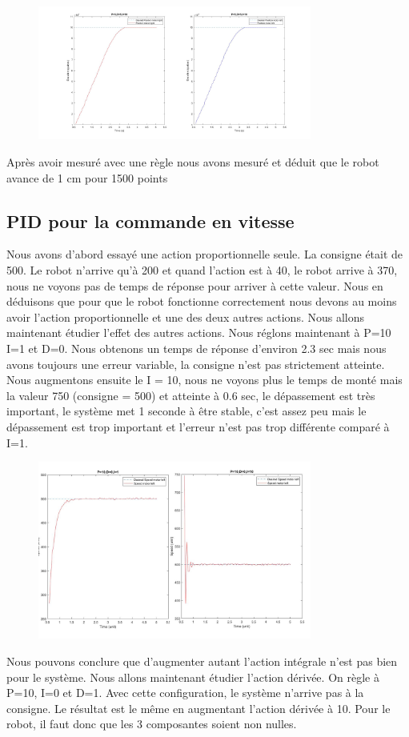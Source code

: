 \documentclass[a4paper]{article}
\begin{document}
		\begin{figure}[h]
			\centering
			\includegraphics[width = 9cm]{imgs/fig5.jpg}
			\caption{}
		\end{figure}
		Après avoir mesuré avec une règle nous avons mesuré et déduit que le robot avance de 1 cm pour 1500 points 
		
	\subsection{PID pour la commande en vitesse}
	
		Nous avons d’abord essayé une action proportionnelle seule. La consigne était de 500. Le robot n’arrive qu'à 200 et quand l’action est à 40, le robot arrive à 370, nous ne voyons pas de temps de réponse pour arriver à cette valeur. Nous en déduisons que pour que le robot fonctionne correctement nous devons au moins avoir l’action proportionnelle et une des deux autres actions.
		Nous allons maintenant étudier l’effet des autres actions.
		Nous réglons maintenant à P=10 I=1 et D=0. Nous obtenons un temps de réponse d’environ 2.3 sec mais nous avons toujours une erreur variable, la consigne n’est pas strictement atteinte.
		Nous augmentons ensuite le I = 10, nous ne voyons plus le temps de monté mais la valeur 750 (consigne = 500) et atteinte à 0.6 sec, le dépassement est très important, le système met 1 seconde à être stable, c’est assez peu mais le dépassement est trop important et l’erreur n’est pas trop différente comparé à I=1.
		\begin{figure}[h]
			\centering
			\includegraphics[width = 9cm]{imgs/fig6.png}
			\caption{}
		\end{figure}
		Nous pouvons conclure que d’augmenter autant l’action intégrale n’est pas bien pour le système.
		Nous allons maintenant étudier l’action dérivée. On règle à P=10, I=0 et D=1. Avec cette configuration, le système n’arrive pas à la consigne.  Le résultat est le même en augmentant l’action dérivée à 10. Pour le robot, il faut donc que les 3 composantes soient non nulles.
		
\end{document}
